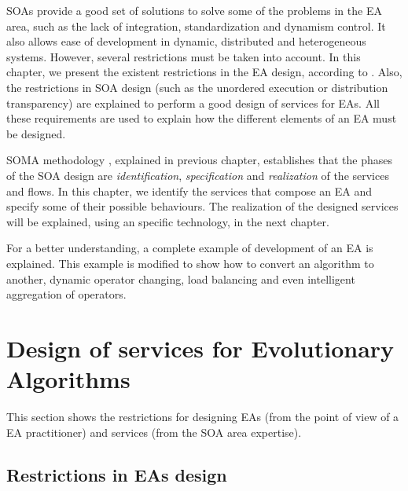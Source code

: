 \label{chap:soaea}
\minitoc\mtcskip
\vfill
\lettrine{S}{OA}s provide a good set of solutions to solve some of the
problems in the EA area, such as the lack of integration,
standardization and dynamism control. It also allows ease of
development in dynamic, distributed and heterogeneous systems. %
 However, several restrictions must be taken into account. In this
 chapter, we present the existent restrictions in the EA design,
 according to  \cite{GENERICITY05}. Also,
 the restrictions in SOA design (such as the unordered execution or
 distribution transparency) are explained to perform %
 a good design of services for EAs. All these requirements are used to explain how the different elements of an EA must be designed.

SOMA methodology \cite{Arsanjani2008SOMA}, explained in previous chapter, establishes that the phases of the SOA design are {\em identification}, {\em specification} and {\em realization} of the services and flows. In this chapter, we identify the services that compose an EA and specify some of their possible behaviours. The realization of the designed services will be explained, using an specific technology, in the next chapter. 

For a better understanding, a complete example of development of an EA
is explained. This example is modified to show how to convert an
algorithm to another, dynamic operator changing, load balancing and
even intelligent aggregation of operators.


\section{Design of services for Evolutionary Algorithms}

This section shows the restrictions for designing EAs (from the point of view of a EA practitioner) and services (from the SOA area expertise).

\subsection{Restrictions in EAs design}

